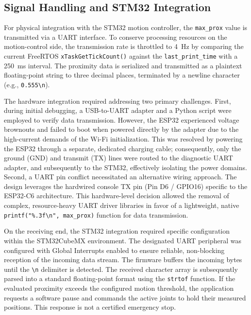 \subsection{Signal Handling and STM32 Integration}
For physical integration with the STM32 motion controller, the \texttt{max\_prox} value is transmitted via a UART interface. To conserve processing resources on the motion-control side, the transmission rate is throttled to 4~Hz by comparing the current FreeRTOS \texttt{xTaskGetTickCount()} against the \texttt{last\_print\_time} with a 250~ms interval. The proximity data is serialized and transmitted as a plaintext floating-point string to three decimal places, terminated by a newline character (e.g., \texttt{0.555\textbackslash n}).

The hardware integration required addressing two primary challenges. First, during initial debugging, a USB-to-UART adapter and a Python script were employed to verify data transmission. However, the ESP32 experienced voltage brownouts and failed to boot when powered directly by the adapter due to the high-current demands of the Wi-Fi initialization. This was resolved by powering the ESP32 through a separate, dedicated charging cable; consequently, only the ground (GND) and transmit (TX) lines were routed to the diagnostic UART adapter, and subsequently to the STM32, effectively isolating the power domains. Second, a UART pin conflict necessitated an alternative wiring approach. The design leverages the hardwired console TX pin (Pin D6 / GPIO16) specific to the ESP32-C6 architecture. This hardware-level decision allowed the removal of complex, resource-heavy UART driver libraries in favor of a lightweight, native \texttt{printf("\%.3f\textbackslash n", max\_prox)} function for data transmission.

On the receiving end, the STM32 integration required specific configuration within the STM32CubeMX environment. The designated UART peripheral was configured with Global Interrupts enabled to ensure reliable, non-blocking reception of the incoming data stream. The firmware buffers the incoming bytes until the \texttt{\textbackslash n} delimiter is detected. The received character array is subsequently parsed into a standard floating-point format using the \texttt{strtof} function. If the evaluated proximity exceeds the configured motion threshold, the application requests a software pause and commands the active joints to hold their measured positions. This response is not a certified emergency stop.
